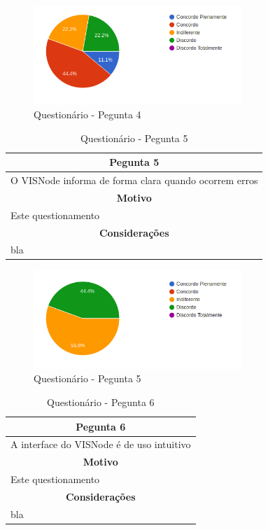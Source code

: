\documentclass[
	12pt,				%
	oneside,			%
	a4paper,			%
	english,			%
	french,				%
	spanish,			%
	brazil,				%
	]{abntex2}
\begin{document}
\begin{figure}[H]
\centering
\caption{Questionário - Pegunta 4}
\includegraphics[width=0.7\textwidth]{imagens/v1/p4.png}
\sourceAuthor
\end{figure}

\begin{table}[H]
\centering
\caption{Questionário - Pegunta 5} 
\def\arraystretch{1.5}
\begin{tabular}{l}
\hline
\multicolumn{1}{c}{\textbf{Pegunta 5}}              \\ \hline
O VISNode informa de forma clara quando ocorrem erros \\ \hline
\multicolumn{1}{c}{\textbf{Motivo}}                 \\ \hline
Este questionamento                                   \\ \hline
\multicolumn{1}{c}{\textbf{Considerações}}          \\ \hline
bla                                                   \\ \hline
\end{tabular}
\sourceAuthor
\end{table}

\begin{figure}[H]
\centering
\caption{Questionário - Pegunta 5}
\includegraphics[width=0.7\textwidth]{imagens/v1/p5.png}
\sourceAuthor
\end{figure}

\begin{table}[H]
\centering
\caption{Questionário - Pegunta 6} 
\def\arraystretch{1.5}
\begin{tabular}{l}
\hline
\multicolumn{1}{c}{\textbf{Pegunta 6}}              \\ \hline
A interface do VISNode é de uso intuitivo \\ \hline
\multicolumn{1}{c}{\textbf{Motivo}}                 \\ \hline
Este questionamento                                   \\ \hline
\multicolumn{1}{c}{\textbf{Considerações}}          \\ \hline
bla                                                   \\ \hline
\end{tabular}
\sourceAuthor
\end{table}
\end{document}

